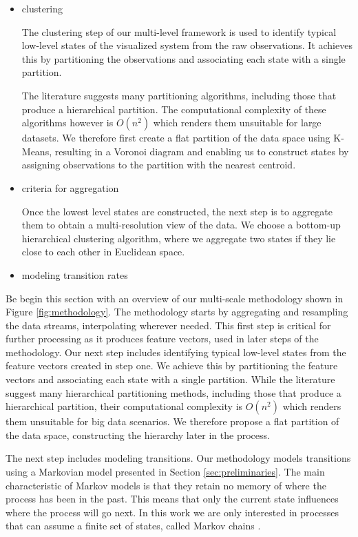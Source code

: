 \begin{itemize}
	\item clustering
	
	The clustering step of our multi-level framework is used to identify typical low-level states
	of the visualized system from the raw observations. It achieves this by partitioning the
	observations and associating each state with a single partition.
	
	The literature suggests many partitioning algorithms, including those that produce a hierarchical 
	partition. The computational complexity of these algorithms however is $O(n^2)$ which renders 
	them unsuitable for large datasets. We therefore first create a flat partition of the data space
	using K-Means, resulting in a Voronoi diagram and enabling us to construct states by assigning
	observations to the partition with the nearest centroid.
	
	\item criteria for aggregation 
	
	Once the lowest level states are constructed, the next step is to aggregate them to obtain a
	multi-resolution view of the data. We choose a bottom-up hierarchical clustering algorithm,
	where we aggregate two states if they lie close to each other in Euclidean space.
	
	\item modeling transition rates
\end{itemize}

Be begin this section with an overview of our multi-scale methodology shown in Figure \ref{fig:methodology}.
The methodology starts by aggregating and resampling the data streams, interpolating wherever needed. This
first step is critical for further processing as it produces feature vectors, used in later steps of the
methodology. Our next step includes identifying typical low-level states from the feature vectors
created in step one. We achieve this by partitioning the feature vectors and associating each state
with a single partition. While the literature suggest many hierarchical partitioning methods, including
those that produce a hierarchical partition, their computational complexity is $O(n^2)$ which
renders them unsuitable for big data scenarios. We therefore propose a flat partition of the data space,
constructing the hierarchy later in the process.

The next step includes modeling transitions. Our methodology models transitions using a Markovian model
presented in Section \ref{sec:preliminaries}. The main characteristic of Markov models is that they
retain no memory of where the process has been in the past. This means that only the current state
influences where the process will go next. In this work we are only interested in processes that
can assume a finite set of states, called Markov chains \cite{norris1998markov}.


